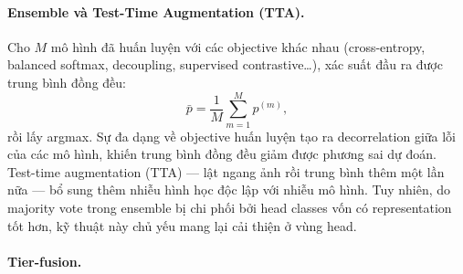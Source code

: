 \paragraph{Ensemble và Test-Time Augmentation (TTA).}
Cho $M$ mô hình đã huấn luyện với các objective khác nhau
(cross-entropy, balanced softmax, decoupling, supervised contrastive\ldots),
xác suất đầu ra được trung bình đồng đều:
\[
    \bar{p} = \frac{1}{M}\sum_{m=1}^{M} p^{(m)},
\]
rồi lấy argmax.
Sự đa dạng về objective huấn luyện tạo ra decorrelation giữa lỗi của các mô hình,
khiến trung bình đồng đều giảm được phương sai dự đoán.
Test-time augmentation (TTA) --- lật ngang ảnh rồi trung bình thêm một lần nữa ---
bổ sung thêm nhiễu hình học độc lập với nhiễu mô hình.
Tuy nhiên, do majority vote trong ensemble bị chi phối bởi head classes
vốn có representation tốt hơn, kỹ thuật này chủ yếu mang lại cải thiện ở vùng head.
\medskip

\paragraph{Tier-fusion.}



